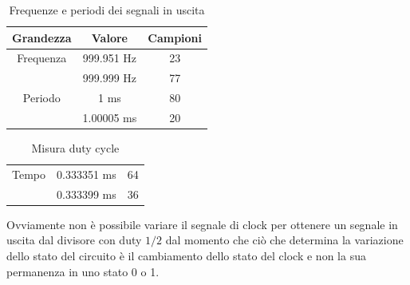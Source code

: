 \documentclass[journal, a4paper]{IEEEtran}
\begin{document}
\begin{table}[htp]
\centering
\caption{Frequenze e periodi dei segnali in uscita}
\label{tab:es6-2}
\begin{tabular}{|c|c|c|}
\hline
Grandezza & Valore & Campioni\\
\hline 
Frequenza & 999.951 Hz & 23 \\ \cline{2-3}
          & 999.999 Hz & 77 \\ 
\hline 
Periodo & 1 ms & 80       \\ \cline{2-3}
        & 1.00005 ms & 20 \\ 
\hline 
\end{tabular} 
\end{table}

\begin{table}[htp]
\centering
\caption{Misura duty cycle}
\label{tab:es6-3}
\begin{tabular}{|c|c|c|}
\hline
Tempo  & 0.333351 ms & 64 \\ \cline{2-3}
       & 0.333399 ms & 36 \\ 
\hline 
\end{tabular} 
\end{table}

Ovviamente non è possibile variare il segnale di clock per ottenere un segnale in uscita dal divisore con duty $1/2$ dal momento che ciò che determina la variazione dello stato del circuito è il cambiamento dello stato del clock e non la sua permanenza in uno stato 0 o 1.
\end{document}
